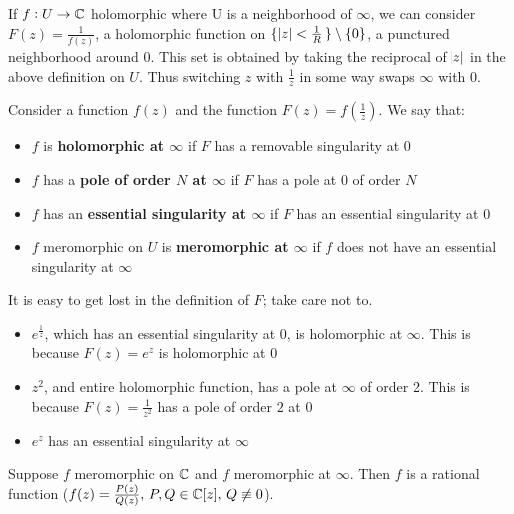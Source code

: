 If $f:U \to \mathbb{C}$ holomorphic where U is a neighborhood of $\infty$, we can consider $F(z) = \frac{1}{f(z)}$, a holomorphic function on $\set{\abs{z} < \frac{1}{R}} \setminus \{ 0 \}$, a punctured neighborhood around $0$. This set is obtained by taking the reciprocal of $\abs{z}$ in the above definition on $U$. Thus switching $z$ with $\frac{1}{z}$ in some way swaps $\infty$ with $0$.

\begin{definition}
Consider a function $f(z)$ and the function $F(z) = f(\frac{1}{z})$. We say that:

\begin{itemize}
    \item $f$ is \textbf{holomorphic at $\infty$} if $F$ has a removable singularity at $0$
    \item $f$ has a \textbf{pole of order $N$ at $\infty$} if $F$ has a pole at $0$ of order $N$ 
    \item $f$ has an \textbf{essential singularity at $\infty$} if $F$ has an essential singularity at $0$
    \item $f$ meromorphic on $U$ is \textbf{meromorphic at $\infty$} if $f$ does not have an essential singularity at $\infty$
\end{itemize}
\end{definition}


\begin{example}
It is easy to get lost in the definition of $F$; take care not to.

\begin{itemize}
    \item $e^{\frac{1}{z}}$, which has an essential singularity at $0$, is holomorphic at $\infty$. This is because $F(z) = e^z$ is holomorphic at $0$
    
    \item $z^2$, and entire holomorphic function, has a pole at $\infty$ of order 2. This is because $F(z) = \frac{1}{z^2}$ has a pole of order $2$ at $0$
    
    \item $e^z$ has an essential singularity at $\infty$
\end{itemize}
\end{example}


\begin{theorem}

Suppose $f $ meromorphic on $\mathbb{C}$ and $f $ meromorphic at $\infty$. 
Then $f$ is a rational function ($f(z) = \frac{P(z)}{Q(z)}, \, P,Q \in \mathbb{C} [z], \, Q \not\equiv 0$).
\end{theorem}

